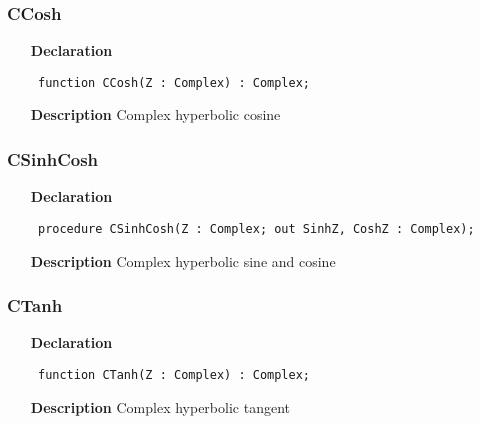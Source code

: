 \documentclass[12pt,a4paper,oneside]{report}
\newcommand{\declarationitem}[1]{\textbf{#1}}
\newcommand{\descriptiontitle}[1]{\textbf{#1}}
\newcommand{\code}[1]{\texttt{#1}}
\begin{document}
\subsubsection{CCosh}
\label{ucomplex-CCosh}
\begin{itemize}\item[\declarationitem{Declaration}\hfill]
\begin{flushleft}
\code{
function CCosh(Z : Complex) : Complex;}

\end{flushleft}

\par
\item[\descriptiontitle{Description}]
Complex hyperbolic cosine

\end{itemize}
\subsubsection{CSinhCosh}
\label{ucomplex-CSinhCosh}
\begin{itemize}\item[\declarationitem{Declaration}\hfill]
\begin{flushleft}
\code{
procedure CSinhCosh(Z : Complex; out SinhZ, CoshZ : Complex);}
\end{flushleft}

\par
\item[\descriptiontitle{Description}]
Complex hyperbolic sine and cosine

\end{itemize}
\subsubsection{CTanh}
\label{ucomplex-CTanh}
\begin{itemize}\item[\declarationitem{Declaration}\hfill]
\begin{flushleft}
\code{
function CTanh(Z : Complex) : Complex;}

\end{flushleft}

\par
\item[\descriptiontitle{Description}]
Complex hyperbolic tangent

\end{itemize}
\end{document}
